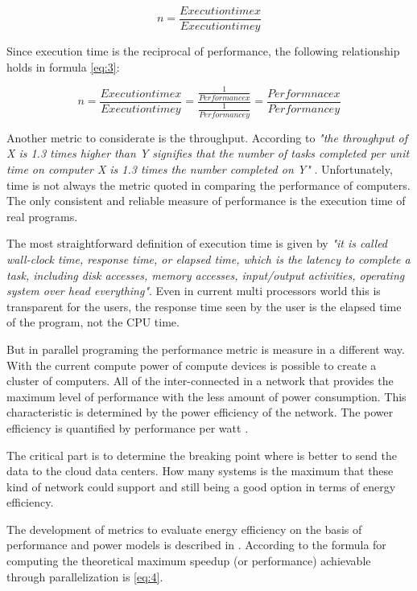 \begin{equation}\label{eq:2}
n = \frac{Execution time x}{Execution time y}
\end{equation}

Since execution time is the reciprocal of performance, the following
relationship holds in formula \ref{eq:3}:

\begin{equation}\label{eq:3}
n = \frac{Execution time x}{Execution time y} = \frac{\frac{1}{Performance
x}}{\frac{1}{Performance y}} = \frac{Performnace x}{Performance y}
\end{equation}

Another metric to considerate is the throughput. According to \cite{Hennessy}
\textit{"the throughput of X is 1.3 times higher than Y signifies that the
number of tasks completed per unit time on computer X is 1.3 times the number
completed on Y"} . Unfortunately, time is not always the metric quoted in
comparing the performance of computers. The only consistent and reliable
measure of performance is the execution time of real programs. 

The most straightforward definition of execution time is given by
\cite{Hennessy} \textit{"it is called wall-clock time, response time, or elapsed
time, which is the latency to complete a task, including disk accesses, memory
accesses, input/output activities, operating system over head everything"}.
Even in current multi processors world this is transparent for the users,  the
response time seen by the user is the elapsed time of the program, not the CPU
time.

But in parallel programing the performance metric is measure in a different
way.  With the current compute power of compute devices is possible to create a
cluster of computers. All of the inter-connected in a network that provides the
maximum level of performance with the less amount of power consumption. This
characteristic is determined by the power efficiency of the network. The power
efficiency is quantified by performance per watt \cite{Jun}.

The critical part is to determine the breaking point where is better to send
the data to the cloud data centers. How many systems is the maximum that these
kind of network could support and still being a good option in terms of energy
efficiency.

The development of metrics to evaluate energy efficiency on the basis of
performance and power models is described in \cite{Dong}. According to
\cite{Dong} the formula for computing the theoretical maximum speedup (or
performance) achievable through parallelization is \ref{eq:4}.

